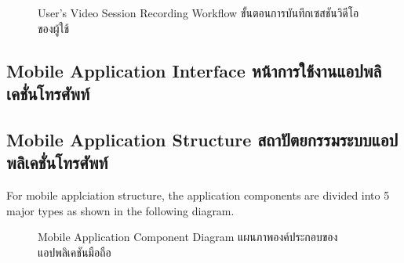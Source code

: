 \begin{figure}[ht]
    \begin{center}
    
    \end{center}
    \newcommand{\MobileAppUserJourner}{\ifenglish User's Video Session Recording Workflow \else ขั้นตอนการบันทึกเซสชันวิดีโอของผู้ใช้ \fi}
    \caption[\MobileAppUserJourner]{\MobileAppUserJourner}
    \label{fig:video session record state diagram}
\end{figure}

\subsection{\ifenglish Mobile Application Interface \else หน้าการใช้งานแอปพลิเคชั่นโทรศัพท์ \fi}

\subsection{\ifenglish Mobile Application Structure \else สถาปัตยกรรมระบบแอปพลิเคชั่นโทรศัพท์ \fi}
For mobile applciation structure, the application components are divided into 5 major types as shown in the following diagram.

\begin{figure}[ht]
    \begin{center}
    \end{center}
    \newcommand{\MobileAppComponentDiagram}{\ifenglish Mobile Application Component Diagram \else แผนภาพองค์ประกอบของแอปพลิเคชันมือถือ \fi}
    \caption[\MobileAppComponentDiagram]{\MobileAppComponentDiagram}
    \label{fig:mobile app component diagram}
\end{figure}

